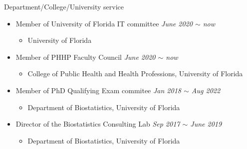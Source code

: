 \documentclass{resume} %
\begin{document}
\begin{rSection}{Department/College/University service}
\begin{itemize}[noitemsep,topsep=0pt]

\item Member of University of Florida IT committee
        \hfill {\em June 2020 $\sim$ now} 
        \begin{itemize}
        \item University of Florida
        \end{itemize}

\item Member of PHHP Faculty Council
        \hfill {\em June 2020 $\sim$ now} 
        \begin{itemize}
        \item College of Public Health and Health Professions, University of Florida
        \end{itemize}

\item Member of PhD Qualifying Exam commitee 
        \hfill {\em Jan 2018 $\sim$ Aug 2022} 
        \begin{itemize}
        \item Department of Biostatistics, University of Florida
        \end{itemize}

\item Director of the Biostatistics Consulting Lab
        \hfill {\em Sep 2017 $\sim$ June 2019} 
        \begin{itemize}
        \item Department of Biostatistics, University of Florida
        \end{itemize}


\end{itemize}
\end{rSection}
\end{document}
